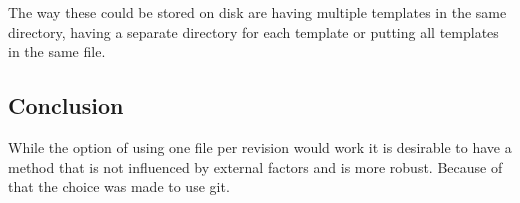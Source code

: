 The way these could be stored on disk are having multiple templates in the same directory, having a separate directory for each template or putting all templates in the same file.

\subsection{Conclusion}
While the option of using one file per revision would work it is desirable to have a method that is not influenced by external factors and is more robust.
Because of that the choice was made to use git.
